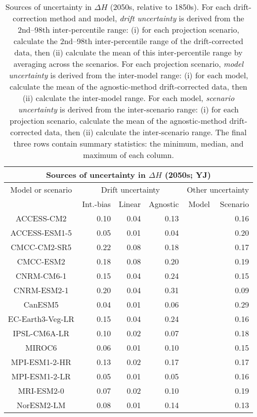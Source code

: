 \begin{table*}[t]
\centering
\caption{Sources of uncertainty in $\Delta H$ (2050s, relative to 1850s). For each drift-correction method and model, \emph{drift uncertainty} is derived from the 2nd--98th inter-percentile range: (i) for each projection scenario, calculate the 2nd--98th inter-percentile range of the drift-corrected data, then (ii) calculate the mean of this inter-percentile range by averaging across the scenarios. For each projection scenario, \emph{model uncertainty} is derived from the inter-model range: (i) for each model, calculate the mean of the agnostic-method drift-corrected data, then (ii) calculate the inter-model range. For each model, \emph{scenario uncertainty} is derived from the inter-scenario range: (i) for each projection scenario, calculate the mean of the agnostic-method drift-corrected data, then (ii) calculate the inter-scenario range. The final three rows contain summary statistics: the minimum, median, and maximum of each column.}
\begin{tabular}{c|rrr|rr}
\toprule
\multicolumn{6}{c}{Sources of uncertainty in $\Delta H$ (2050s; YJ)} \\ 
\midrule
Model or scenario & \multicolumn{3}{c|}{Drift uncertainty} & \multicolumn{2}{c}{Other uncertainty} \\
 & Int.-bias & Linear & Agnostic & Model & Scenario \\
\midrule
ACCESS-CM2 & 0.10 & 0.04 & 0.13 &  & 0.16 \\
ACCESS-ESM1-5 & 0.05 & 0.01 & 0.04 &  & 0.20 \\
CMCC-CM2-SR5 & 0.22 & 0.08 & 0.18 &  & 0.17 \\
CMCC-ESM2 & 0.18 & 0.08 & 0.20 &  & 0.19 \\
CNRM-CM6-1 & 0.15 & 0.04 & 0.24 &  & 0.15 \\
CNRM-ESM2-1 & 0.20 & 0.04 & 0.31 &  & 0.09 \\
CanESM5 & 0.04 & 0.01 & 0.06 &  & 0.29 \\
EC-Earth3-Veg-LR & 0.15 & 0.04 & 0.24 &  & 0.16 \\
IPSL-CM6A-LR & 0.10 & 0.02 & 0.07 &  & 0.18 \\
MIROC6 & 0.06 & 0.01 & 0.10 &  & 0.15 \\
MPI-ESM1-2-HR & 0.13 & 0.02 & 0.17 &  & 0.17 \\
MPI-ESM1-2-LR & 0.05 & 0.01 & 0.05 &  & 0.16 \\
MRI-ESM2-0 & 0.07 & 0.02 & 0.10 &  & 0.19 \\
NorESM2-LM & 0.08 & 0.01 & 0.14 &  & 0.13 \\

\end{tabular}
\end{table*}

